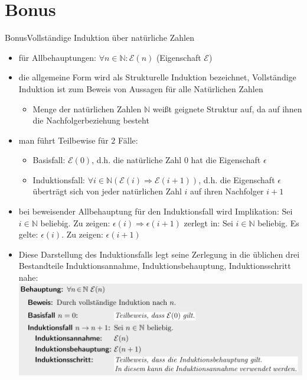 
\section{Bonus}

\begin{frame}[allowframebreaks]{Bonus}{Vollständige Induktion über natürliche Zahlen\vspace{0.5cm}}
  \begin{itemize}
    \item für \alert{Allbehauptungen}: $\forall n\in\mathbb{N}:\mathcal{E}(n)$ (Eigenschaft $\mathcal{E}$)
    \item die allgemeine Form wird als \alert{Strukturelle Induktion} bezeichnet, \alert{Vollständige Induktion} ist zum Beweis von Aussagen für alle Natürlichen Zahlen
    \begin{itemize}
      \item Menge der \alert{natürlichen Zahlen} $\mathbb{N}$ weißt geignete Struktur auf, da auf ihnen die Nachfolgerbeziehung besteht
    \end{itemize}
    \item man führt Teilbewise für $2$ Fälle: 
    \begin{itemize}
      \item \alert{Basisfall:} ${\mathcal{E}}(0)$, d.h. die natürliche Zahl $0$ hat die Eigenschaft $\epsilon$
      \item \alert{Induktionsfall:} $\forall i\in\mathbb{N} \left(\mathcal{E}(i)\Rightarrow\mathcal{E}(i+1)\right)$, d.h. die Eigenschaft $\epsilon$ überträgt sich von jeder natürlichen Zahl $i$ auf ihren Nachfolger $i + 1$
    \end{itemize}
    \item bei beweisender Allbehauptung für den Induktionsfall wird Implikation: Sei $i\in\mathbb{N}$ beliebig. Zu zeigen: $\epsilon(i)\Rightarrow\epsilon(i+1)$ zerlegt in: Sei $i\in\mathbb{N}$ beliebig. Es gelte: $\epsilon(i)$. Zu zeigen: $\epsilon(i+1)$
    \item Diese Darstellung des Induktionsfalls legt seine Zerlegung in die üblichen drei Bestandteile \alert{Induktionsannahme}, \alert{Induktionsbehauptung}, \alert{Induktionsschritt} nahe:
  \includegraphics[width=\linewidth]{./figures/vollstaendige_induktion.png}

\end{itemize}
\end{frame}
